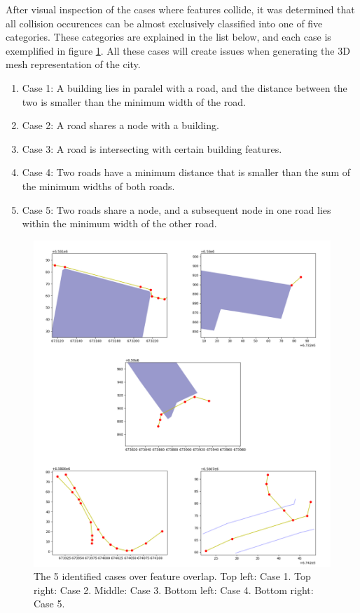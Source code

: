 \documentclass{kththesis}
\begin{document}
After visual inspection of the cases where features collide, it was determined that all collision occurences can be almost exclusively classified into one of five categories.
These categories are explained in the list below, and each case is exemplified in figure \ref{fig:collision-cases}.
All these cases will create issues when generating the 3D mesh representation of the city.

\begin{enumerate}
\item Case 1: A building lies in paralel with a road, and the distance between the two is smaller than the minimum width of the road.
\item Case 2: A road shares a node with a building.
\item Case 3: A road is intersecting with certain building features.
\item Case 4: Two roads have a minimum distance that is smaller than the sum of the minimum widths of both roads. 
\item Case 5: Two roads share a node, and a subsequent node in one road lies within the minimum width of the other road.
\end{enumerate}

\begin{figure}[H]
    \centering
    \includegraphics[width=\textwidth,height=0.5\textheight,keepaspectratio]{img_feature_overlap_cases}
    \caption{The 5 identified cases over feature overlap. Top left: Case 1. Top right: Case 2. Middle: Case 3. Bottom left: Case 4. Bottom right: Case 5.}
    \label{fig:collision-cases}
\end{figure}
\end{document}
